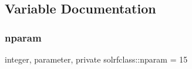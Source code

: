 \subsection{Variable Documentation}
\mbox{\label{namespacesolrfclass_a01b965e25069cff9fb1797fbbcb9939d}} 
\subsubsection{\texorpdfstring{nparam}{nparam}}
{\footnotesize\ttfamily integer, parameter, private solrfclass\+::nparam = 15\hspace{0.3cm}{\ttfamily [private]}}

